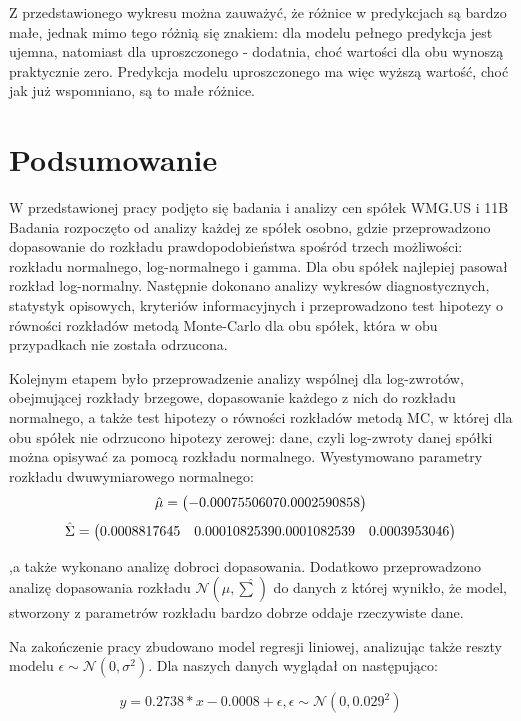 \documentclass[a4paper,11pt]{article}
\def\\{\hfill\break}
\begin{document}
Z przedstawionego wykresu można zauważyć, że różnice w predykcjach są bardzo małe, jednak mimo tego różnią się znakiem: dla modelu pełnego predykcja jest ujemna, natomiast dla uproszczonego - dodatnia, choć wartości dla obu wynoszą praktycznie zero. Predykcja modelu uproszczonego ma więc wyższą wartość, choć jak już wspomniano, są to małe różnice.

\newpage
\section{Podsumowanie}
W przedstawionej pracy podjęto się badania i analizy cen spółek WMG.US i 11B 
Badania rozpoczęto od analizy każdej ze spółek osobno, gdzie przeprowadzono dopasowanie do rozkładu prawdopodobieństwa spośród trzech możliwości: rozkładu normalnego, log-normalnego i gamma. Dla obu spółek najlepiej pasował rozkład log-normalny. Następnie dokonano analizy wykresów diagnostycznych, statystyk opisowych, kryteriów informacyjnych i przeprowadzono test hipotezy o równości rozkładów metodą Monte-Carlo dla obu spółek, która w obu przypadkach nie została odrzucona.

Kolejnym etapem było przeprowadzenie analizy wspólnej dla log-zwrotów, obejmującej rozkłady brzegowe, dopasowanie każdego z nich do rozkładu normalnego, a także test hipotezy o równości rozkładów metodą MC, w której dla obu spółek nie odrzucono hipotezy zerowej: dane, czyli log-zwroty danej spółki można opisywać za pomocą rozkładu normalnego. Wyestymowano parametry rozkładu dwuwymiarowego normalnego:
\[
\hat{\mu} = \begin{pmatrix}
-0.0007550607 \\ %
0.0002590858 %
\end{pmatrix}
\]
\[
\hat{\Sigma} = \begin{pmatrix}
0.0008817645 & 0.0001082539 \\ %
0.0001082539 & 0.0003953046 %
\end{pmatrix}
\]

,a także wykonano analizę dobroci dopasowania. Dodatkowo przeprowadzono analizę dopasowania rozkładu \(\mathcal{N}(\hat{\mu}, \hat{\sum})\) do danych z której wynikło, że model, stworzony z parametrów rozkładu bardzo dobrze oddaje rzeczywiste dane.
 
Na zakończenie pracy zbudowano model regresji liniowej, analizując także reszty modelu \(\epsilon \sim \mathcal{N}(0, \sigma^2)\). Dla naszych danych wyglądał on następująco: 

\[y = 0.2738 * x - 0.0008 + \epsilon, \epsilon \sim \mathcal{N}(0, 0.029^2 )\]
\end{document}
